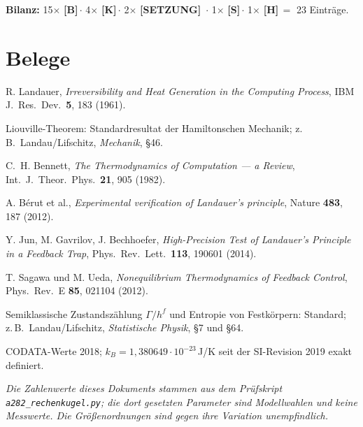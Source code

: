 \documentclass[11pt,a4paper]{article}
\newcommand{\LS}{\textcolor{laySet}{\textbf{\footnotesize\textsf{[SETZUNG]}}}\,}
\newcommand{\LK}{\textcolor{layK}{\textbf{\footnotesize\textsf{[K]}}}\,}
\newcommand{\LB}{\textcolor{layB}{\textbf{\footnotesize\textsf{[B]}}}\,}
\newcommand{\LSk}{\textcolor{layS}{\textbf{\footnotesize\textsf{[S]}}}\,}
\newcommand{\LH}{\textcolor{layH}{\textbf{\footnotesize\textsf{[H]}}}\,}
\begin{document}
\textbf{Bilanz:} 15$\times$ \LB $\cdot$ 4$\times$ \LK $\cdot$ 2$\times$ \LS
$\cdot$ 1$\times$ \LSk $\cdot$ 1$\times$ \LH $=$ 23 Einträge.

\clearpage
{}
{}
\section*{Belege}

\begingroup
\small
\begin{description}[leftmargin=3.2em,style=sameline,itemsep=0.3em]

\item[{[B1]}] R. Landauer, \emph{Irreversibility and Heat Generation in the
Computing Process}, IBM J.\ Res.\ Dev.\ \textbf{5}, 183 (1961).

\item[{[B2]}] Liouville-Theorem: Standardresultat der Hamiltonschen Mechanik;
z.\,B.\ Landau/Lifschitz, \emph{Mechanik}, §46.

\item[{[B3]}] C.~H. Bennett, \emph{The Thermodynamics of Computation --- a
Review}, Int.\ J.\ Theor.\ Phys.\ \textbf{21}, 905 (1982).

\item[{[B4]}] A. Bérut et al., \emph{Experimental verification of Landauer's
principle}, Nature \textbf{483}, 187 (2012).

\item[{[B5]}] Y. Jun, M. Gavrilov, J. Bechhoefer, \emph{High-Precision Test of
Landauer's Principle in a Feedback Trap}, Phys.\ Rev.\ Lett.\ \textbf{113},
190601 (2014).

\item[{[B6]}] T. Sagawa und M. Ueda, \emph{Nonequilibrium Thermodynamics of
Feedback Control}, Phys.\ Rev.\ E \textbf{85}, 021104 (2012).

\item[{[B7]}] Semiklassische Zustandszählung $\Gamma/h^f$ und Entropie von
Festkörpern: Standard; z.\,B.\ Landau/Lifschitz, \emph{Statistische Physik}, §7
und §64.

\item[{[B8]}] CODATA-Werte 2018; $k_B = 1{,}380649\cdot10^{-23}$\,J/K seit der
SI-Revision 2019 exakt definiert.

\end{description}
\endgroup

\vspace{1em}
\noindent
{\small\itshape Die Zahlenwerte dieses Dokuments stammen aus dem Prüfskript
\texttt{a282\_rechenkugel.py}; die dort gesetzten Parameter sind Modellwahlen und
keine Messwerte. Die Größenordnungen sind gegen ihre Variation unempfindlich.}
\end{document}
